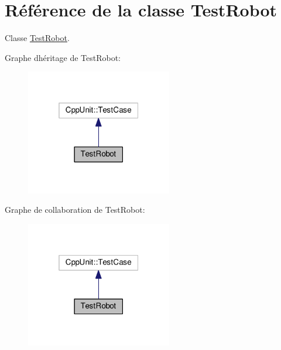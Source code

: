 \hypertarget{classTestRobot}{}\section{Référence de la classe Test\+Robot}
\label{classTestRobot}


Classe \hyperlink{classTestRobot}{Test\+Robot}.  




Graphe d\textquotesingle{}héritage de Test\+Robot\+:\nopagebreak
\begin{figure}[H]
\begin{center}
\leavevmode
\includegraphics[width=181pt]{classTestRobot__inherit__graph}
\end{center}
\end{figure}


Graphe de collaboration de Test\+Robot\+:\nopagebreak
\begin{figure}[H]
\begin{center}
\leavevmode
\includegraphics[width=181pt]{classTestRobot__coll__graph}
\end{center}
\end{figure}
